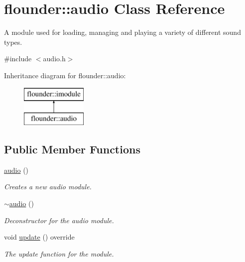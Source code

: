 \hypertarget{classflounder_1_1audio}{}\section{flounder\+:\+:audio Class Reference}
\label{classflounder_1_1audio}


A module used for loading, managing and playing a variety of different sound types.  




{\ttfamily \#include $<$audio.\+h$>$}

Inheritance diagram for flounder\+:\+:audio\+:\begin{figure}[H]
\begin{center}
\leavevmode
\includegraphics[height=2.000000cm]{classflounder_1_1audio}
\end{center}
\end{figure}
\subsection*{Public Member Functions}
\begin{DoxyCompactItemize}
\item 
\hyperlink{classflounder_1_1audio_a0aabbb226f542847145d89adb1144c16}{audio} ()
\begin{DoxyCompactList}\small\item\em Creates a new audio module. \end{DoxyCompactList}\item 
\hyperlink{classflounder_1_1audio_afb4d3bbb9ae399385a3abfe6e4e6d7ee}{$\sim$audio} ()
\begin{DoxyCompactList}\small\item\em Deconstructor for the audio module. \end{DoxyCompactList}\item 
void \hyperlink{classflounder_1_1audio_aabff6a1996b8571404023b6ac17009b6}{update} () override
\begin{DoxyCompactList}\small\item\em The update function for the module. \end{DoxyCompactList}\end{DoxyCompactItemize}
